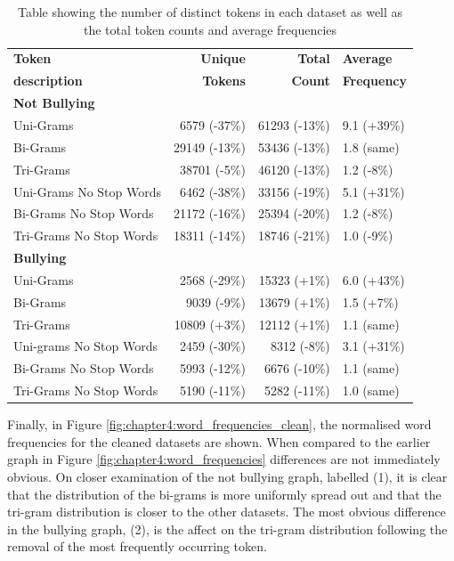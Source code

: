 \begin{table}[h]
\centering
\caption[Unique tokens, total count and average frequency (cleaned datasets)]{Table showing the number of distinct tokens in each dataset as well as the total token counts and average frequencies}
\label{tab:chapter4:word_distribution_clean}
\begin{tabular}{lrrl}
	\toprule
	{\textbf{Token}} 		& {\textbf{Unique}} & {\textbf{Total}} & {\textbf{Average}}  \\
	{\textbf{description}}	& {\textbf{Tokens}} & {\textbf{Count}} & {\textbf{Frequency}}  \\
    \midrule
    \midrule
    \multicolumn{1}{l}{\textbf{Not Bullying}} \\
	\cmidrule(l){1-1}
	Uni-Grams					& 6579 (-37\%) &	61293 (-13\%)	& 9.1 (+39\%) \\
	Bi-Grams					& 29149 (-13\%) &	53436 (-13\%)	& 1.8 (same)\\
	Tri-Grams					& 38701 (-5\%) &	46120 (-13\%)	& 1.2 (-8\%) \\
	Uni-Grams No Stop Words		& 6462 (-38\%) &	33156 (-19\%)	& 5.1 (+31\%) \\
	Bi-Grams No Stop Words		& 21172 (-16\%) &	25394 (-20\%)	& 1.2 (-8\%) \\
	Tri-Grams No Stop Words		& 18311 (-14\%) &	18746 (-21\%)	& 1.0 (-9\%) \\
    \midrule
    \midrule 
    \multicolumn{1}{l}{\textbf{Bullying}} \\
	\cmidrule(l){1-1}
	Uni-Grams					& 2568 (-29\%) &	15323 (+1\%)	& 6.0 (+43\%) \\
	Bi-Grams					& 9039 (-9\%) &	13679 (+1\%)	& 1.5 (+7\%) \\
	Tri-Grams					& 10809 (+3\%) &	12112 (+1\%)	& 1.1 (same)\\
	Uni-grams No Stop Words		& 2459 (-30\%) &	8312 (-8\%)	& 3.1 (+31\%) \\
	Bi-Grams No Stop Words		& 5993 (-12\%) &	6676 (-10\%)	& 1.1 (same)\\
	Tri-Grams No Stop Words		& 5190 (-11\%) &	5282 (-11\%)	& 1.0 (same)\\
    \bottomrule
    \end{tabular}
\end{table}

Finally, in Figure \ref{fig:chapter4:word_frequencies_clean}, the normalised word frequencies for the cleaned datasets are shown. When compared to the earlier graph in Figure \ref{fig:chapter4:word_frequencies} differences are not immediately obvious. On closer examination of the not bullying graph, labelled (1), it is clear that the distribution of the bi-grams is more uniformly spread out and that the tri-gram distribution is closer to the other datasets. The most obvious difference in the bullying graph, (2), is the affect on the tri-gram distribution following the removal of the most frequently occurring token.

